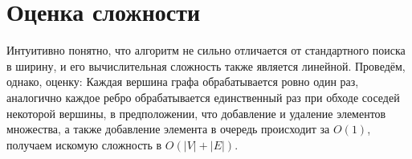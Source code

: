 \documentclass[a4paper,14pt]{article}
\begin{document}
\section{Оценка сложности}
	 Интуитивно понятно, что алгоритм не сильно отличается от стандартного поиска в ширину, и его вычислительная сложность также является линейной.
	\newline
	\newline Проведём, однако, оценку:
	\newline
	\newline Каждая вершина графа обрабатывается ровно один раз, аналогично каждое ребро обрабатывается единственный раз при обходе соседей некоторой вершины, в предположении, что добавление и удаление элементов множества, а также добавление элемента в очередь происходит за $O(1)$, получаем искомую сложность в $O(|V|+|E|)$.
\end{document}
